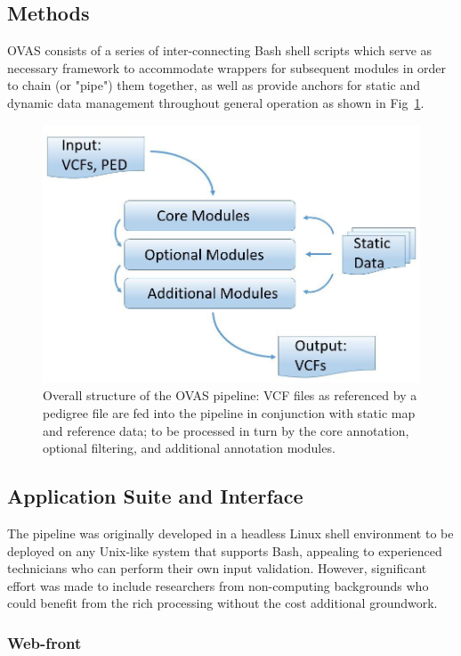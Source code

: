 \documentclass{bioinfo}
\def\app{OVAS}
\begin{document}
\begin{methods}

\section{Methods}

\app{} consists of a series of inter-connecting Bash shell scripts which serve as necessary framework to accommodate wrappers for subsequent modules in order to chain (or "pipe") them together, as well as provide anchors for static and dynamic data management throughout general operation as shown in Fig~\ref{fig:structure}.

\begin{figure}[!tpb]
  \centerline{\includegraphics[width=0.7\columnwidth]{structure.jpg}}\caption{Overall structure of the \app{} pipeline: VCF files as referenced by a pedigree file are fed into the pipeline in conjunction with static map and reference data; to be processed in turn by the core annotation, optional filtering, and additional annotation modules.}\label{fig:structure}
\end{figure}


 
\subsection{Application Suite and Interface}

The pipeline was originally developed in a headless Linux shell environment to be deployed on any Unix-like system that supports Bash, appealing to experienced technicians who can perform their own input validation. However, significant effort was made to include researchers from non-computing backgrounds who could benefit from the rich processing without the cost additional groundwork.


\subsubsection{Web-front}


\end{methods}
\end{document}
